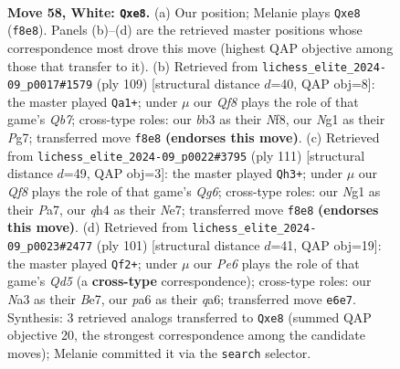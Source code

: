 \documentclass[11pt]{article}
\begin{document}
\clearpage

\begin{figure}[p]\centering
\begin{subfigure}{0.46\textwidth}\centering
\resizebox{\linewidth}{!}{%
\newchessgame
\chessboard[
  setfen={4nQ2/7k/p3P3/3P3p/6pq/Nb6/5P2/5KN1 w - - 5 58},
  showmover=false,
  pgfstyle=straightmove, color=movearrow, markmove={f8-e8}
]}
\caption{}
\end{subfigure}\hfill
\begin{subfigure}{0.46\textwidth}\centering
\resizebox{\linewidth}{!}{%
\newchessgame
\chessboard[
  setfen={5nk1/6p1/1NBP3p/2P1p3/6b1/4Q1P1/1q5P/4K3 b - - 30 55},
  showmover=false,
  pgfstyle=straightmove, color=movearrow, markmove={b2-a1}
]}
\caption{}
\end{subfigure}
\\[4pt]
\begin{subfigure}{0.46\textwidth}\centering
\resizebox{\linewidth}{!}{%
\newchessgame
\chessboard[
  setfen={8/p3npk1/8/1p2PP1K/2pNQ3/6q1/P7/8 b - - 4 56},
  showmover=false,
  pgfstyle=straightmove, color=movearrow, markmove={g3-h3}
]}
\caption{}
\end{subfigure}\hfill
\begin{subfigure}{0.46\textwidth}\centering
\resizebox{\linewidth}{!}{%
\newchessgame
\chessboard[
  setfen={8/4b1k1/Q3P1p1/5p2/P2q1Pn1/1P3BN1/8/4K3 b - - 0 51},
  showmover=false,
  pgfstyle=straightmove, color=movearrow, markmove={d4-f2}
]}
\caption{}
\end{subfigure}
\caption{\textbf{Move 58, White: \texttt{Qxe8}.} (a) Our position; Melanie plays \texttt{Qxe8} (\texttt{f8e8}). Panels (b)--(d) are the retrieved master positions whose correspondence most drove this move (highest QAP objective among those that transfer to it). (b) Retrieved from \texttt{lichess\_elite\_2024-09\_p0017\#1579} (ply 109) [structural distance $d$=40, QAP obj=8]: the master played \texttt{Qa1+}; under $\mu$ our \emph{Qf8} plays the role of that game's \emph{Qb7}; cross-type roles: our \emph{b}b3 as their \emph{N}f8, our \emph{N}g1 as their \emph{P}g7; transferred move \texttt{f8e8} \textbf{(endorses this move)}. (c) Retrieved from \texttt{lichess\_elite\_2024-09\_p0022\#3795} (ply 111) [structural distance $d$=49, QAP obj=3]: the master played \texttt{Qh3+}; under $\mu$ our \emph{Qf8} plays the role of that game's \emph{Qg6}; cross-type roles: our \emph{N}g1 as their \emph{P}a7, our \emph{q}h4 as their \emph{N}e7; transferred move \texttt{f8e8} \textbf{(endorses this move)}. (d) Retrieved from \texttt{lichess\_elite\_2024-09\_p0023\#2477} (ply 101) [structural distance $d$=41, QAP obj=19]: the master played \texttt{Qf2+}; under $\mu$ our \emph{Pe6} plays the role of that game's \emph{Qd5} (a \textbf{cross-type} correspondence); cross-type roles: our \emph{N}a3 as their \emph{B}e7, our \emph{p}a6 as their \emph{q}a6; transferred move \texttt{e6e7}. Synthesis: 3 retrieved analogs transferred to \texttt{Qxe8} (summed QAP objective 20, the strongest correspondence among the candidate moves); Melanie committed it via the \texttt{search} selector.}
\label{fig:thought-m114}
\end{figure}
\end{document}
